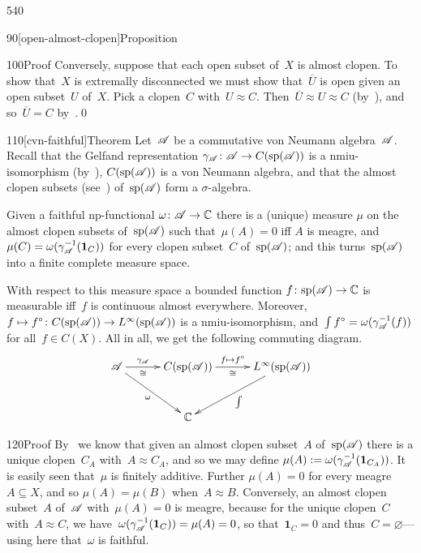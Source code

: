 \begin{parsec}{540}
\begin{point}{90}[open-almost-clopen]{Proposition}
\begin{point}{100}{Proof}
Conversely,
suppose that each open subset of~$X$ is almost clopen.
To show that~$X$ is extremally disconnected
we must show that~$\overline{U}$ is open given
an open subset~$U$ of~$X$.
Pick a clopen~$C$ with~$U\approx C$.
Then~$\overline{U}\approx U\approx C$
(by~),
and so~$\overline{U}=C$ by~.\qed
\end{point}
\end{point}
\begin{point}{110}[cvn-faithful]{Theorem}%
Let~$\mathscr{A}$ be a commutative von Neumann algebra~$\mathscr{A}$.
Recall that
the Gelfand representation $\gamma_{\mathscr{A}}\colon 
\mathscr{A}\to C(\mathrm{sp}(\mathscr{A}))$
is a nmiu-isomorphism (by~),
$C(\mathrm{sp}(\mathscr{A}))$ is a von Neumann algebra,
and that the almost clopen subsets (see~) of~$\mathrm{sp}(\mathscr{A})$
form a $\sigma$-algebra.

Given a faithful np-functional $\omega\colon \mathscr{A}\to\mathbb{C}$
there is a (unique) measure
$\mu$ on the almost clopen subsets of~$\mathrm{sp}(\mathscr{A})$
such that~$\mu(A)=0$ iff $A$ is meagre,
and~$\mu(C)=\omega(\gamma_{\mathscr{A}}^{-1} (\mathbf{1}_{C}))$
for every clopen subset~$C$ of~$\mathrm{sp}(\mathscr{A})$;
and this turns~$\mathrm{sp}(\mathscr{A})$
into a finite complete measure space.

With respect to this measure space a
bounded function $f\colon \mathrm{sp}(\mathscr{A})\to\mathbb{C}$
is measurable iff~$f$ is continuous almost everywhere.
Moreover, 
$f\mapsto f^\circ\colon C(\mathrm{sp}(\mathscr{A}))\to L^\infty(\mathrm{sp}(\mathscr{A}))$
is a nmiu-isomorphism,
and~$\int f^\circ = \omega(\gamma_{\mathscr{A}}^{-1}(f))$ for all~$f\in C(X)$.
All in all,
we get the following commuting diagram.
\begin{equation*}
\xymatrix@C=3em@R=3em{
\scrA
\ar[r]^-{\gamma_\scrA}_-\cong
\ar[rd]_\omega
&
C(\spec(\scrA))
\ar[r]^-{f\mapsto f^\circ}_-\cong
&
L^\infty(\spec(\scrA))
\ar[ld]^\int
\\
&
\C
}
\end{equation*}
\begin{point}{120}{Proof}%
By~
we know that given an almost clopen subset~$A$
of~$\mathrm{sp}(\mathscr{A})$
there is a unique clopen~$C_A$
with~$A\approx C_A$,
and 
so we may define
$\mu(A):=\omega(\gamma_{\mathscr{A}}^{-1}(\mathbf{1}_{C_A}))$.
It is easily seen that~$\mu$
is finitely additive.
Further $\mu(A)=0$ for every meagre~$A\subseteq X$,
and so $\mu(A)=\mu(B)$ when~$A\approx B$.
Conversely, 
an almost clopen subset~$A$
of~$\mathscr{A}$
with~$\mu(A)=0$
is meagre,
because for the unique clopen~$C$ with~$A\approx C$,
we have~$\omega(\gamma_{\mathscr{A}}^{-1}(\mathbf{1}_C))=\mu(A)=0$,
so that~$\mathbf{1}_C=0$ and thus~$C=\varnothing$---using here
that~$\omega$ is faithful.


\end{point}
\end{point}
\end{parsec}
